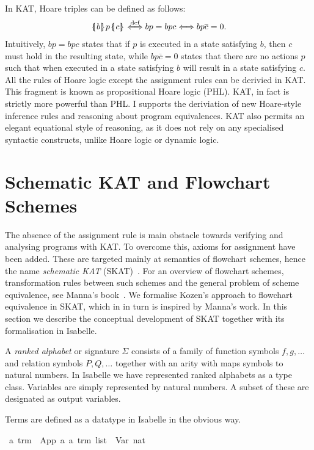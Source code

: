 \documentclass{llncs}
\newcommand{\llbrace}{\hspace{1pt} \lbrace \kern -3pt \vert \hspace{1pt}}
\newcommand{\rrbrace}{\hspace{0.5pt} \rbrace \kern -5pt \vert \hspace{3pt}}
\newcommand{\triple}[3]{\llbrace #1 \rrbrace #2 \llbrace #3 \rrbrace}
\begin{document}
In KAT, Hoare triples can be defined as follows:
\begin{align}
\label{eq:kathoare}
\triple{b}{p}{c} \overset{\text{def}}{\Longleftrightarrow} bp = bpc \Longleftrightarrow bp\overline{c} = 0.
\end{align}
Intuitively, $bp = bpc$ states that if $p$ is executed in a state
satisfying $b$, then $c$ must hold in the resulting state, while
$bp\overline{c} = 0$ states that there are no actions $p$ such that
when executed in a state satisfying $b$ will result in a state
satisfying $c$. All the rules of Hoare logic except the assignment
rules can be derivied in KAT. This fragment is known as propositional
Hoare logic (PHL). KAT, in fact is strictly more powerful than PHL. I
supports the deriviation of new Hoare-style inference rules and
reasoning about program equivalences. KAT also permits an elegant
equational style of reasoning, as it does not rely on any specialised
syntactic constructs, unlike Hoare logic or dynamic logic.

\section{Schematic KAT and Flowchart Schemes}
\label{sec:skat}

The absence of the assignment rule is main obstacle towards verifying
and analysing programs with KAT. To overcome this, axioms for
assignment have been added. These are targeted mainly at semantics of
flowchart schemes, hence the name \emph{schematic KAT}
(SKAT)~\cite{Angus01}. For an overview of flowchart schemes,
transformation rules between such schemes and the general problem of
scheme equivalence, see Manna's book~\cite{Manna}. We formalise
Kozen's approach to flowchart equivalence in SKAT, which in in turn is
inspired by Manna's work. In this section we describe the conceptual
development of SKAT together with its formalisation in Isabelle.

A \emph{ranked alphabet} or signature $\Sigma$ consists of a family of
function symbols $f,g,\dots$ and relation symbols $P,Q,\dots$ together
with an arity with maps symbols to natural numbers. In Isabelle we
have represented ranked alphabets as a type class. Variables are
simply represented by natural numbers. A subset of these are designated
as output variables.

Terms are defined as a datatype in Isabelle in the obvious way.

\begin{isabellebody}
\isanewline
{}\isamarkupfalse%
\ {}a\ trm\ {}\ App\ {}a\ {}{}a\ trm\ list{}\ {}\ Var\ nat\isanewline
\end{isabellebody}
\end{document}

